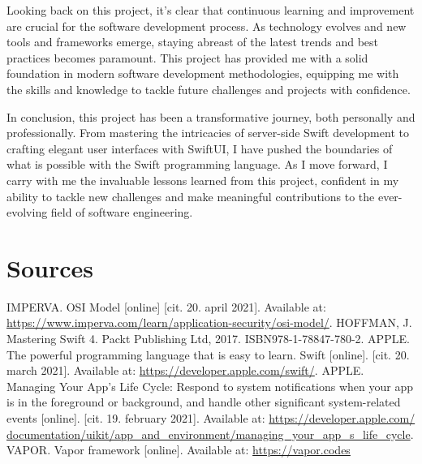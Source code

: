 \documentclass[
  biblatex,
  language=english,
  figures=false,
  sourcecodes,
  glossaries,
  index
]{kidiplom}
\begin{document}
\begin{kiconclusions}
Looking back on this project, it's clear that continuous learning and improvement are crucial for the software development process. As technology evolves and new tools and frameworks emerge, staying abreast of the latest trends and best practices becomes paramount. This project has provided me with a solid foundation in modern software development methodologies, equipping me with the skills and knowledge to tackle future challenges and projects with confidence.

In conclusion, this project has been a transformative journey, both personally and professionally. From mastering the intricacies of server-side Swift development to crafting elegant user interfaces with SwiftUI, I have pushed the boundaries of what is possible with the Swift programming language. As I move forward, I carry with me the invaluable lessons learned from this project, confident in my ability to tackle new challenges and make meaningful contributions to the ever-evolving field of software engineering.

\end{kiconclusions}


\appendix

\section{Sources} \label{sec:ObsahData}

\begin{thebibliography}{9}
 \uppercase{Imperva.} OSI Model [online] [cit. 20. april 2021]. Available at: \url{https://www.imperva.com/learn/application-security/osi-model/}.
 \uppercase{Hoffman, J.} Mastering Swift 4. Packt Publishing Ltd, 2017. ISBN978-1-78847-780-2.
 \uppercase{Apple.} The powerful programming language that is easy to learn. Swift [online]. [cit. 20. march 2021]. Available at: \url{https://developer.apple.com/swift/}.
 \uppercase{Apple.} Managing Your App’s Life Cycle: Respond to system notifications when your app is in the foreground or background, and handle other significant system-related events [online]. [cit. 19. february 2021]. Available at: \url{https://developer.apple.com/ documentation/uikit/app_and_environment/managing_your_app_s_life_cycle}.
 \uppercase{Vapor.} Vapor framework [online]. Available at: \url{https://vapor.codes}
\end{thebibliography}

\printindex
\end{document}
